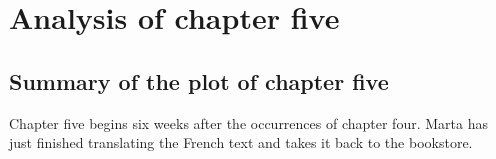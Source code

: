 \section{Analysis of chapter five}

\subsection{Summary of the plot of chapter five}

Chapter five begins six weeks after the occurrences of chapter four.
Marta has just finished translating the French text and takes it back to the bookstore.
